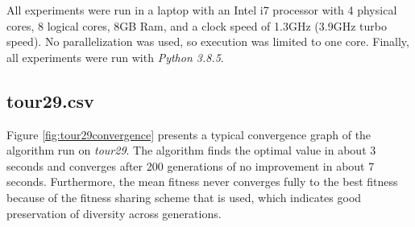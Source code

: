\documentclass[a4paper,10pt]{article}
\newcommand{\ReplaceMe}[1]{{\color{blue}#1}}
\begin{document}
All experiments were run in a laptop with an Intel i7 processor with 4 physical cores, 8 logical cores, 8GB Ram, and a clock speed of 1.3GHz (3.9GHz turbo speed). No parallelization was used, so execution was limited to one core. Finally, all experiments were run with \textit{Python 3.8.5}.

\subsection{tour29.csv} \label{ss:tour29}





Figure \ref{fig:tour29convergence} presents a typical convergence graph of the algorithm run on \textit{tour29}. The algorithm finds the optimal value in about 3 seconds and converges after 200 generations of no improvement in about 7 seconds. Furthermore, the mean fitness never converges fully to the best fitness because of the fitness sharing scheme that is used, which indicates good preservation of diversity across generations.
\end{document}
